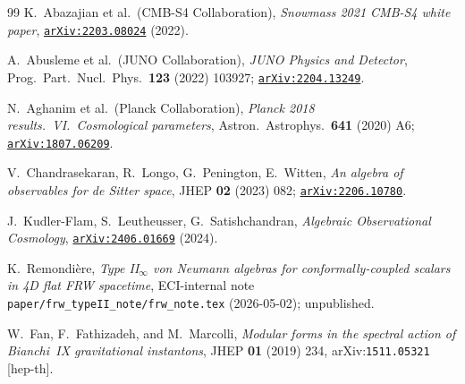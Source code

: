 \documentclass[a4paper,11pt]{article}
\newcommand{\arXiv}[1]{\href{https://arxiv.org/abs/#1}{\texttt{arXiv:#1}}}
\theoremstyle{definition}
\theoremstyle{remark}
\begin{document}
\begin{thebibliography}{99}
K.~Abazajian et al.\ (CMB-S4 Collaboration),
\emph{Snowmass 2021 CMB-S4 white paper},
\arXiv{2203.08024} (2022).

A.~Abusleme et al.\ (JUNO Collaboration),
\emph{JUNO Physics and Detector},
Prog.\ Part.\ Nucl.\ Phys.\ \textbf{123} (2022) 103927;
\arXiv{2204.13249}.

N.~Aghanim et al.\ (Planck Collaboration),
\emph{Planck 2018 results.\ VI.\ Cosmological parameters},
Astron.~Astrophys.\ \textbf{641} (2020) A6;
\arXiv{1807.06209}.


V.~Chandrasekaran, R.~Longo, G.~Penington, E.~Witten,
\emph{An algebra of observables for de Sitter space},
JHEP \textbf{02} (2023) 082;
\arXiv{2206.10780}.

J.~Kudler-Flam, S.~Leutheusser, G.~Satishchandran,
\emph{Algebraic Observational Cosmology},
\arXiv{2406.01669} (2024).

K.~Remondi\`ere,
\emph{Type II$_\infty$ von Neumann algebras for conformally-coupled
scalars in 4D flat FRW spacetime},
ECI-internal note \texttt{paper/frw\_typeII\_note/frw\_note.tex}
(2026-05-02); unpublished.

W.~Fan, F.~Fathizadeh, and M.~Marcolli,
\emph{Modular forms in the spectral action of Bianchi~IX gravitational
  instantons},
JHEP \textbf{01} (2019) 234,
arXiv:\texttt{1511.05321} [hep-th].


\end{thebibliography}
\end{document}
